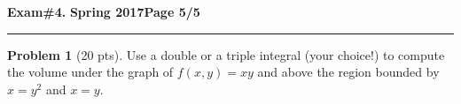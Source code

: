 \documentclass[12pt]{article}
\theoremstyle{definition}
\newtheorem{problem}{Problem}
\begin{document}
\newpage

\hfill{\large\bf Exam\#4.}\hfill{\large\bf
  Spring 2017}\hfill{\large\bf Page 5/5}\hrule

\bigskip
\begin{problem}[20 pts]
Use a double or a triple integral (your choice!) to compute the volume under the graph of $f(x,y)=xy$ and above the region bounded by $x=y^2$ and $x=y$.
\vspace{20cm}
\begin{flushright}
\end{flushright}
\end{problem}
\end{document}
